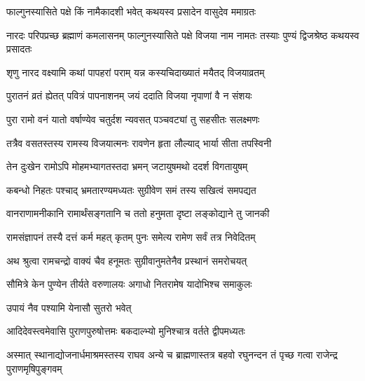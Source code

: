 \label{sec:padma-phalguna-krishna-vijaya}

\ganapatyadiDhyanam
\padmaPuranam



\twolineshloka
{फाल्गुनस्यासिते पक्षे किं नामैकादशी भवेत्}
{कथयस्व प्रसादेन वासुदेव ममाग्रतः}%


\threelineshloka
{नारदः परिपप्रच्छ ब्रह्माणं कमलासनम्}
{फाल्गुनस्यासिते पक्षे विजया नाम नामतः}
{तस्याः पुण्यं द्विजश्रेष्ठ कथयस्व प्रसादतः}%


\twolineshloka
{शृणु नारद वक्ष्यामि कथां पापहरां पराम्}
{यन्न कस्यचिदाख्यातं मयैतद् विजयाव्रतम्}%

\twolineshloka
{पुरातनं व्रतं ह्येतत् पवित्रं पापनाशनम्}
{जयं ददाति विजया नृपाणां वै न संशयः}%

\twolineshloka
{पुरा रामो वनं यातो वर्षाण्येव चतुर्दश}
{न्यवसत् पञ्चवट्यां तु  सहसीतः सलक्ष्मणः}%

\twolineshloka
{तत्रैव वसतस्तस्य रामस्य विजयात्मनः}
{रावणेन हृता लौल्याद् भार्या सीता तपस्विनी}%

\twolineshloka
{तेन दुःखेन रामोऽपि मोहमभ्यागतस्तदा}
{भ्रमन् जटायुषमथो ददर्श विगतायुषम्}%

\twolineshloka
{कबन्धो निहतः पश्चाद् भ्रमतारण्यमध्यतः}
{सुग्रीवेण समं तस्य सखित्वं समपद्यत}%

\twolineshloka
{वानराणामनीकानि रामार्थंसङ्गतानि च}
{ततो हनुमता दृष्टा लङ्कोद्याने तु जानकी}%

\twolineshloka
{रामसंज्ञापनं तस्यै दत्तं कर्म महत् कृतम्}
{पुनः समेत्य रामेण सर्वं तत्र निवेदितम्}%

\twolineshloka
{अथ श्रुत्वा रामचन्द्रो वाक्यं चैव हनूमतः}
{सुग्रीवानुमतेनैव प्रस्थानं समरोचयत्}%


\twolineshloka
{सौमित्रे केन पुण्येन तीर्यते वरुणालयः}
{अगाधो नितरामेष यादोभिश्च समाकुलः}%

\onelineshloka
{उपायं नैव पश्यामि येनासौ सुतरो भवेत्}%


\twolineshloka
{आदिदेवस्त्वमेवासि पुराणपुरुषोत्तमः}
{बकदाल्भ्यो मुनिश्चात्र वर्तते द्वीपमध्यतः}%

\threelineshloka
{अस्मात् स्थानाद्योजनार्धमाश्रमस्तस्य राघव}
{अन्ये च ब्राह्मणास्तत्र बहवो रघुनन्दन}
{तं पृच्छ गत्वा राजेन्द्र पुराणमृषिपुङ्गवम्}%

